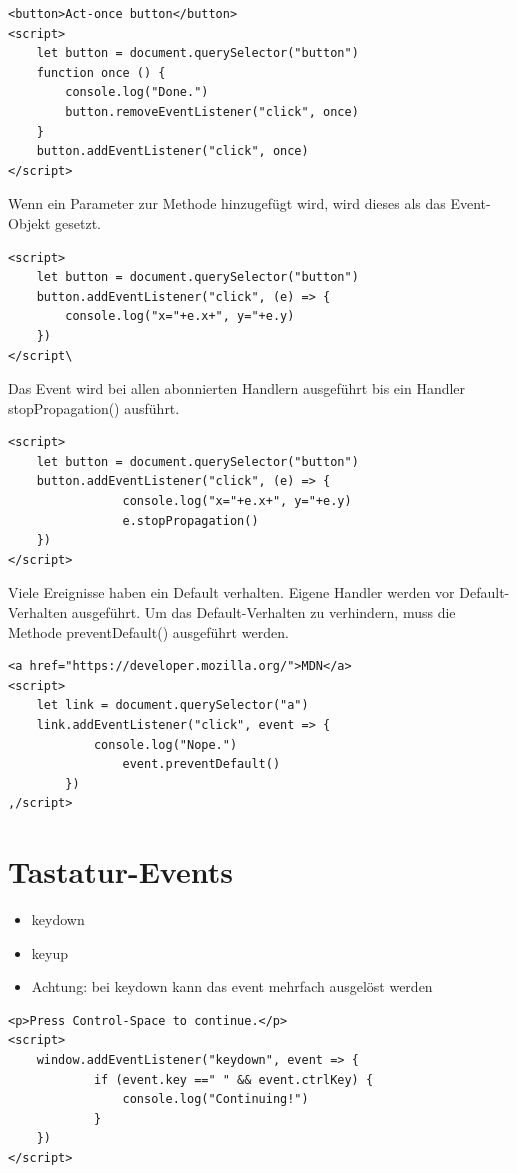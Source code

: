 \documentclass[10pt]{article}
\begin{document}
\begin{verbatim}
<button>Act-once button</button>
<script>
    let button = document.querySelector("button")
    function once () {
        console.log("Done.")
        button.removeEventListener("click", once)
    }
    button.addEventListener("click", once)
</script>
\end{verbatim}

Wenn ein Parameter zur Methode hinzugefügt wird, wird dieses als das Event-Objekt gesetzt.

\begin{verbatim}
<script>
    let button = document.querySelector("button")
    button.addEventListener("click", (e) => {
        console.log("x="+e.x+", y="+e.y)
    })
</script\
\end{verbatim}

Das Event wird bei allen abonnierten Handlern ausgeführt bis ein Handler stopPropagation() ausführt.

\begin{verbatim}
<script>
    let button = document.querySelector("button")
    button.addEventListener("click", (e) => {
                console.log("x="+e.x+", y="+e.y)
                e.stopPropagation()
    })
</script>
\end{verbatim}

Viele Ereignisse haben ein Default verhalten. Eigene Handler werden vor Default-Verhalten ausgeführt. Um das Default-Verhalten zu verhindern, muss die Methode preventDefault() ausgeführt werden.

\begin{verbatim}
<a href="https://developer.mozilla.org/">MDN</a>
<script>
    let link = document.querySelector("a")
    link.addEventListener("click", event => {
            console.log("Nope.")
                event.preventDefault()
        })
,/script>
\end{verbatim}

\section*{Tastatur-Events}
\begin{itemize}
  \item keydown
  \item keyup
  \item Achtung: bei keydown kann das event mehrfach ausgelöst werden
\end{itemize}

\begin{verbatim}
<p>Press Control-Space to continue.</p>
<script>
    window.addEventListener("keydown", event => {
            if (event.key ==" " && event.ctrlKey) {
                console.log("Continuing!")
            }
    })
</script>
\end{verbatim}
\end{document}
